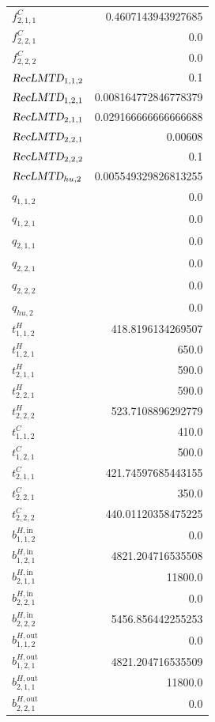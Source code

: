 \documentclass{article}%
\begin{document}
\begin{multicols*}{3}
\begin{supertabular}{lr}
	$f_{2,1,1}^{C}$ & 0.4607143943927685 \\%
	$f_{2,2,1}^{C}$ & 0.0 \\%
	$f_{2,2,2}^{C}$ & 0.0 \\%
	$\textsl{RecLMTD}_{1,1,2}$ & 0.1 \\%
	$\textsl{RecLMTD}_{1,2,1}$ & 0.008164772846778379 \\%
	$\textsl{RecLMTD}_{2,1,1}$ & 0.029166666666666688 \\%
	$\textsl{RecLMTD}_{2,2,1}$ & 0.00608 \\%
	$\textsl{RecLMTD}_{2,2,2}$ & 0.1 \\%
	$\textsl{RecLMTD}_{hu,2}$ & 0.005549329826813255 \\%
	$q_{1,1,2}$ & 0.0 \\%
	$q_{1,2,1}$ & 0.0 \\%
	$q_{2,1,1}$ & 0.0 \\%
	$q_{2,2,1}$ & 0.0 \\%
	$q_{2,2,2}$ & 0.0 \\%
	$q_{hu,2}$ & 0.0 \\%
	$t_{1,1,2}^{H}$ & 418.8196134269507 \\%
	$t_{1,2,1}^{H}$ & 650.0 \\%
	$t_{2,1,1}^{H}$ & 590.0 \\%
	$t_{2,2,1}^{H}$ & 590.0 \\%
	$t_{2,2,2}^{H}$ & 523.7108896292779 \\%
	$t_{1,1,2}^{C}$ & 410.0 \\%
	$t_{1,2,1}^{C}$ & 500.0 \\%
	$t_{2,1,1}^{C}$ & 421.74597685443155 \\%
	$t_{2,2,1}^{C}$ & 350.0 \\%
	$t_{2,2,2}^{C}$ & 440.01120358475225 \\%
	$b_{1,1,2}^{H,\text{in}}$ & 0.0 \\%
	$b_{1,2,1}^{H,\text{in}}$ & 4821.204716535508 \\%
	$b_{2,1,1}^{H,\text{in}}$ & 11800.0 \\%
	$b_{2,2,1}^{H,\text{in}}$ & 0.0 \\%
	$b_{2,2,2}^{H,\text{in}}$ & 5456.856442255253 \\%
	$b_{1,1,2}^{H,\text{out}}$ & 0.0 \\%
	$b_{1,2,1}^{H,\text{out}}$ & 4821.204716535509 \\%
	$b_{2,1,1}^{H,\text{out}}$ & 11800.0 \\%
	$b_{2,2,1}^{H,\text{out}}$ & 0.0 \\%

\end{supertabular}
\end{multicols*}
\end{document}
